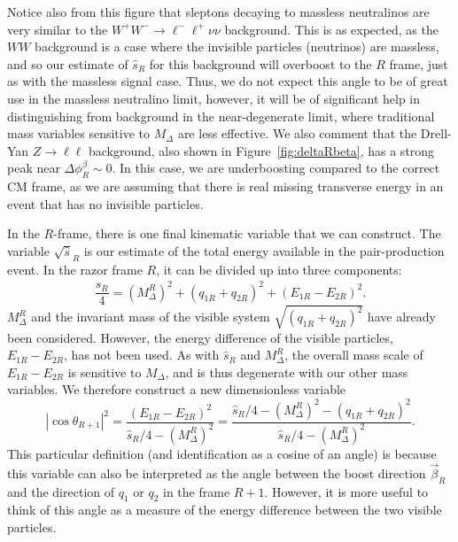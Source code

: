Notice also from this figure that sleptons decaying to massless neutralinos are very similar to the $W^+W^- \to \ell^-\ell^+ \nu\nu$ background. This is as expected, as the $WW$ background is a case where the invisible particles (neutrinos) are massless, and so our estimate of $\hat{s}_R$ for this background will overboost to the $R$ frame, just as with the massless signal case. Thus, we do not expect this angle to be of great use in the massless neutralino limit, however, it will be of significant help in distinguishing from background in the near-degenerate limit, where traditional mass variables sensitive to $M_\Delta$ are less effective. We also comment that the Drell-Yan $Z \to \ell \ell$ background, also shown in Figure~\ref{fig:deltaRbeta}, has a strong peak near $\Delta\phi_R^{\beta}\sim 0$. In this case, we are underboosting compared to the correct CM frame, as we are assuming that there is real missing transverse energy in an event that has no invisible particles.

In the $R$-frame, there is one final kinematic variable that we can construct. The variable $\sqrt{\hat{s}}_R$ is our estimate of the total energy available in the pair-production event. In the razor frame $R$, it can be divided up into three components:
\begin{equation}
\frac{\hat{s}_R}{4} = (M_\Delta^R)^2+(q_{1R}+q_{2R})^2+(E_{1R}-E_{2R})^2. \label{eq:shatRexpansion}
\end{equation}
$M_\Delta^R$ and the invariant mass of the visible system $\sqrt{(q_{1R}+q_{2R})^2}$ have already been considered. However, the energy difference of the visible particles, $E_{1R}-E_{2R}$, has not been used. As with $\hat{s}_R$ and $M_\Delta^R$, the overall mass scale of $E_{1R}-E_{2R}$ is sensitive to $M_\Delta$, and is thus degenerate with our other mass variables. We therefore construct a new dimensionless variable
\begin{equation}
|\cos\theta_{R+1}|^2 = \frac{(E_{1R}-E_{2R})^2}{\hat{s}_R/4-(M_\Delta^R)^2} = \frac{\hat{s}_R/4-(M_\Delta^R)^2-(q_{1R}+q_{2R})^2}{\hat{s}_R/4-(M_\Delta^R)^2}. \label{eq:costhetaR1}
\end{equation}
This particular definition (and identification as a cosine of an angle) is because this variable can also be interpreted as the angle between the boost direction $\vec{\beta}_R$ and the direction of $q_1$ or $q_2$ in the frame $R+1$. However, it is more useful to think of this angle as a measure of the energy difference between the two visible particles.

